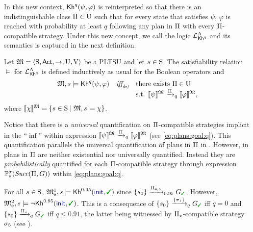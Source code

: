 In this new context, $\kh^q(\psi,\varphi)$ is reinterpreted so that
there is an indistinguishable class $\plans\in\Unc$ such that for
every state that satisfies $\psi$, $\varphi$ is reached with
probability at least $q$ following any plan in $\plans$ with every
$\plans$-compatible strategy.
%
Under this new concept, we call the logic $\PKhadapt$ and its
semantics is captured in the next definition.

\begin{definition}\label{def:semantics:PKhadapt}
  Let $\model = \tup{\S,\Act,\ra,\Unc,\V}$ be a PLTSU and let $s\in\S$.  The
  satisfiability relation $\models$ for $\PKhadapt$ is defined inductively 
  as usual for the Boolean operators and
  \[
  \begin{array}{l@{\ \ \ }c@{\ \ \  }l}
    \model, s \models \kh^q(\psi,\varphi) & \iffdef &  \text{there exists } {\plans \in \Unc}  \\
    & & \text{s.t. } {\truthset{\model}{\psi} \reach{\plans}_q \truthset{\model}{\varphi}}, 
  \end{array}
  \]    
  where $\truthset{\model}{\chi} = \csetsc{s\in\S}{\model,s\models\chi}$.
\end{definition}

Notice that there is a \emph{universal} quantification on
$\plans$-compatible strategies implicit in the ``$\inf$'' within
expression
$\truthset{\model}{\psi}\reach{\plans}_q\truthset{\model}{\varphi}$
(see \cref{eq:plans:goal:q}).
%
This quantification parallels the universal quantification of plans in
$\plans$ in .
%
However, in  plans in $\plans$ are
neither existential nor universally quantified.  Instead they are
\emph{probabilistically} quantified for each $\plans$-compatible
strategy through expression $\Prob^\strat_s(\Succ(\plans,G))$ within
\cref{eq:plans:goal:q}.

\begin{example}\label{ex:running:pkhadapt}
  For all $s\in\S$, $\modelex^1,s \models \kh^{0.95}(\init,\goal)$ since 
  $\{s_0\}\reach{\plans_{4,5}}_{0.95}G_{\goal}$.
  However, $\modelex^2,s \models \neg\kh^{0.95}(\init,\goal)$.  This
  is a consequence of $\{s_0\}\reach{\{\plan_1\}}_qG_{\goal}$ iff
  $q=0$ and $\{s_0\}\reach{\plans_{\star}}_qG_{\goal}$ iff $q\leq
  0.91$, the latter being witnessed by $\plans_{\star}$-compatible
  strategy $\strat_5$ (see ).
\end{example}



